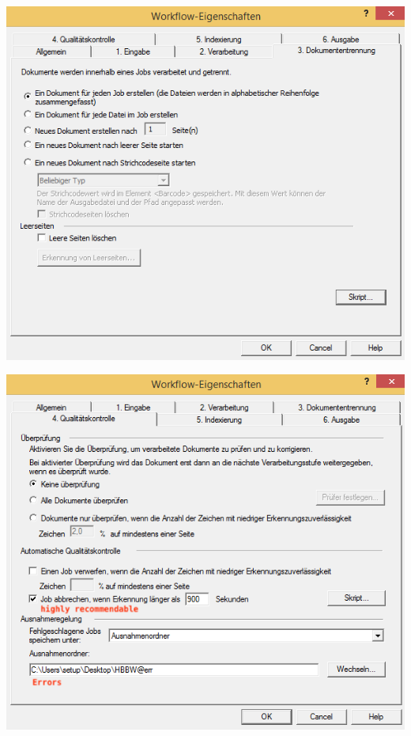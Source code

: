 \begin{minipage}{0.4\textwidth}
\begin{center}
\includegraphics[scale=0.42]{3_dokumententrennung.png}
\end{center}
\end{minipage}
\begin{minipage}{0.4\textwidth}
\begin{center}
\includegraphics[scale=0.42]{4_qualitaetskontrolle.png}
\end{center}
\end{minipage}


